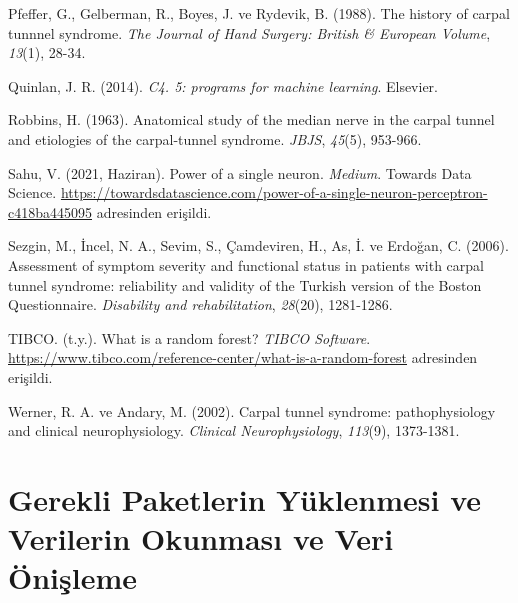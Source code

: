 \documentclass[12pt,twoside]{deuthesis}
\begin{document}
\begin{CSLReferences}
\leavevmode{}%
Pfeffer, G., Gelberman, R., Boyes, J. ve Rydevik, B. (1988). The history of carpal tunnnel syndrome. \emph{The Journal of Hand Surgery: British \& European Volume}, \emph{13}(1), 28-34.

\leavevmode{}%
Quinlan, J. R. (2014). \emph{C4. 5: programs for machine learning}. Elsevier.

\leavevmode{}%
Robbins, H. (1963). Anatomical study of the median nerve in the carpal tunnel and etiologies of the carpal-tunnel syndrome. \emph{JBJS}, \emph{45}(5), 953-966.

\leavevmode{}%
Sahu, V. (2021, Haziran). Power of a single neuron. \emph{Medium}. Towards Data Science. \url{https://towardsdatascience.com/power-of-a-single-neuron-perceptron-c418ba445095} adresinden erişildi.

\leavevmode{}%
Sezgin, M., İncel, N. A., Sevim, S., Çamdeviren, H., As, İ. ve Erdoğan, C. (2006). Assessment of symptom severity and functional status in patients with carpal tunnel syndrome: reliability and validity of the Turkish version of the Boston Questionnaire. \emph{Disability and rehabilitation}, \emph{28}(20), 1281-1286.

\leavevmode{}%
TIBCO. (t.y.). What is a random forest? \emph{TIBCO Software}. \url{https://www.tibco.com/reference-center/what-is-a-random-forest} adresinden erişildi.

\leavevmode{}%
Werner, R. A. ve Andary, M. (2002). Carpal tunnel syndrome: pathophysiology and clinical neurophysiology. \emph{Clinical Neurophysiology}, \emph{113}(9), 1373-1381.

\end{CSLReferences}
\setlength{\parindent}{-0.20in}
\setlength{\leftskip}{0.20in}
\setlength{\parskip}{8pt}

\appendix

\hypertarget{gerekli-paketlerin-yuxfcklenmesi-ve-verilerin-okunmasux131-ve-veri-uxf6niux15fleme}{%
\chapter{Gerekli Paketlerin Yüklenmesi ve Verilerin Okunması ve Veri Önişleme}\label{gerekli-paketlerin-yuxfcklenmesi-ve-verilerin-okunmasux131-ve-veri-uxf6niux15fleme}}
\end{document}
